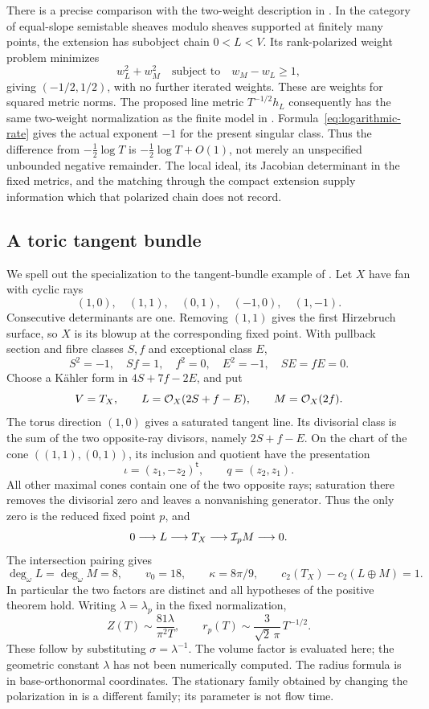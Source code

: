 There is a precise comparison with the two-weight description
in \cite[Section~3]{W_Singular}. In the category of equal-slope
semistable sheaves modulo sheaves supported at finitely many
points, the extension has subobject chain \(0<L<V\).
Its rank-polarized weight problem minimizes
\[
 w_L^2+w_M^2\quad\text{subject to}\quad w_M-w_L\ge1,
\]
giving \((-1/2,1/2)\), with no further iterated weights.
These are weights for squared metric norms. The proposed
line metric \(T^{-1/2}h_L\) consequently has the same
two-weight normalization as the finite model in
\cite[Example~5.12]{HKKP23}.
Formula~\eqref{eq:logarithmic-rate} gives the actual
exponent \(-1\) for the present singular class.
Thus the difference from \(-\frac12\log T\) is
\(-\frac12\log T+O(1)\), not merely an unspecified
unbounded negative remainder. The local ideal, its
Jacobian determinant in the fixed metrics, and the
matching through the compact extension supply information
which that polarized chain does not record.

\subsection{A toric tangent bundle}

We spell out the specialization to the tangent-bundle example
of \cite[Section~2]{W_Singular}. Let \(X\) have fan with cyclic rays
\[
 (1,0),\quad(1,1),\quad(0,1),\quad(-1,0),\quad(1,-1).
\]
Consecutive determinants are one. Removing \((1,1)\)
gives the first Hirzebruch surface, so \(X\) is its
blowup at the corresponding fixed point. With pullback
section and fibre classes \(S,f\) and exceptional class \(E\),
\[
 S^2=-1,\quad Sf=1,\quad f^2=0,\quad E^2=-1,\quad SE=fE=0.
\]
Choose a Kähler form in \(4S+7f-2E\), and put
\[
 V=T_X,\qquad L=\mathcal O_X(2S+f-E),\qquad M=\mathcal O_X(2f).
\]
The torus direction \((1,0)\) gives a saturated tangent
line. Its divisorial class is the sum of the two
opposite-ray divisors, namely \(2S+f-E\).
On the chart of the cone \(((1,1),(0,1))\), its
inclusion and quotient have the presentation
\[
 \iota=(z_1,-z_2)^{\mathsf t},\qquad q=(z_2,z_1).
\]
All other maximal cones contain one of the two
opposite rays; saturation there removes the divisorial
zero and leaves a nonvanishing generator. Thus the
only zero is the reduced fixed point \(p\), and
\[
 0\longrightarrow L\longrightarrow T_X
          \longrightarrow\mathcal I_pM\longrightarrow0.
\]
The intersection pairing gives
\[
 \deg_\omega L=\deg_\omega M=8,\qquad
 v_0=18,\qquad \kappa=8\pi/9,\qquad
 c_2(T_X)-c_2(L\oplus M)=1.
\]
In particular the two factors are distinct and all
hypotheses of the positive theorem hold.
Writing \(\lambda=\lambda_p\) in the fixed normalization,
\begin{equation}\label{eq:toric-asymptotic}
 Z(T)\sim\frac{81\lambda}{\pi^2T},\qquad
 r_p(T)\sim\frac{3}{\sqrt2\,\pi}\,T^{-1/2}.
\end{equation}
These follow by substituting \(\sigma=\lambda^{-1}\).
The volume factor is evaluated here; the geometric
constant \(\lambda\) has not been numerically computed.
The radius formula is in base-orthonormal coordinates.
The stationary family obtained by changing the
polarization in \cite[Section~7]{W_Singular} is a
different family; its parameter is not flow time.

